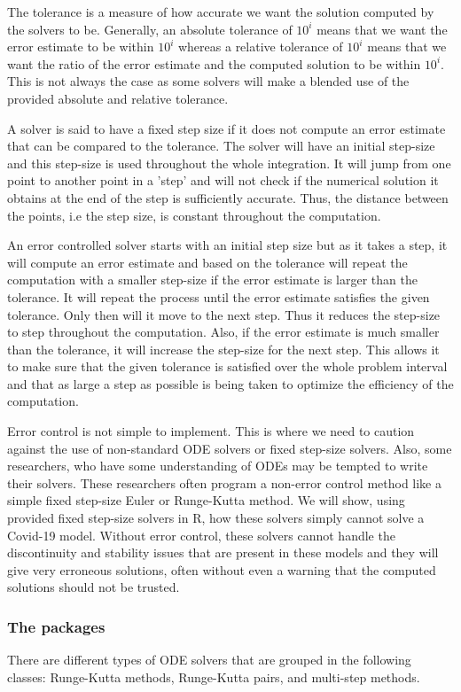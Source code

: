 The tolerance is a measure of how accurate we want the solution computed by the solvers to be. Generally, an absolute tolerance of $10^{i}$ means that we want the error estimate to be within $10^{i}$ whereas a relative tolerance of $10^{i}$ means that we want the ratio of the error estimate and the computed solution to be within $10^{i}$. This is not always the case as some solvers will make a blended use of the provided absolute and relative tolerance.

A solver is said to have a fixed step size if it does not compute an error estimate that can be compared to the tolerance. The solver will have an initial step-size and this step-size is used throughout the whole integration. It will jump from one point to another point in a 'step' and will not check if the numerical solution it obtains at the end of the step is sufficiently accurate. Thus, the distance between the points, i.e the step size, is constant throughout the computation.

An error controlled solver starts with an initial step size but as it takes a step, it will compute an error estimate and based on the tolerance will repeat the computation with a smaller step-size if the error estimate is larger than the tolerance. It will repeat the process until the error estimate satisfies the given tolerance. Only then will it move to the next step. Thus it reduces the step-size to step throughout the computation. Also, if the error estimate is much smaller than the tolerance, it will increase the step-size for the next step. This allows it to make sure that the given tolerance is satisfied over the whole problem interval and that as large a step as possible is being taken to optimize the efficiency of the computation.

Error control is not simple to implement. This is where we need to caution against the use of non-standard ODE solvers or fixed step-size solvers. Also, some researchers, who have some understanding of ODEs may be tempted to write their solvers. These researchers often program a non-error control method like a simple fixed step-size Euler or Runge-Kutta method. We will show, using provided fixed step-size solvers in R, how these solvers simply cannot solve a Covid-19 model. Without error control, these solvers cannot handle the discontinuity and stability issues that are present in these models and they will give very erroneous solutions, often without even a warning that the computed solutions should not be trusted.

\subsubsection{The packages}
\label{subsection:numerical_software_used}
There are different types of ODE solvers that are grouped in the following classes: Runge-Kutta methods, Runge-Kutta pairs, and multi-step methods.

